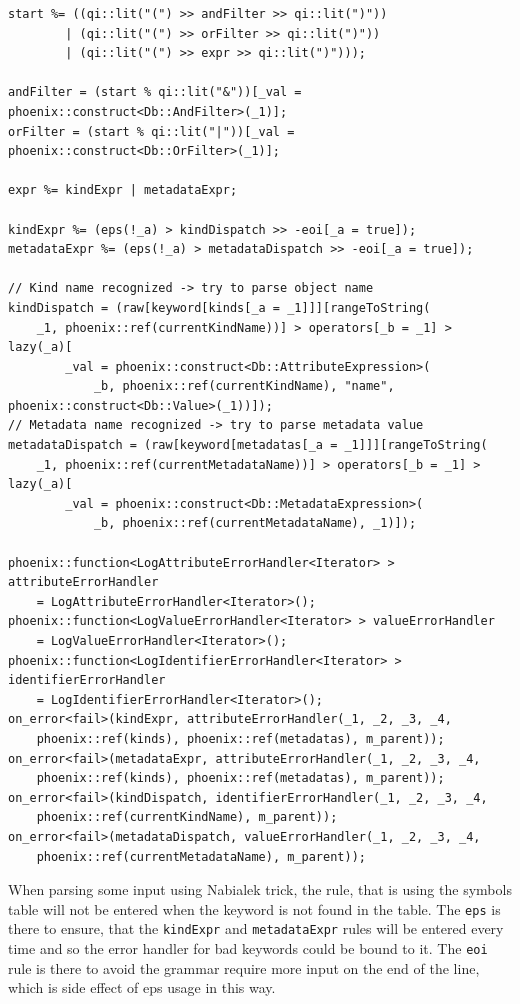 \documentclass[deska]{subfiles}
\begin{document}
\begin{verbatim}
start %= ((qi::lit("(") >> andFilter >> qi::lit(")"))
        | (qi::lit("(") >> orFilter >> qi::lit(")"))
        | (qi::lit("(") >> expr >> qi::lit(")")));

andFilter = (start % qi::lit("&"))[_val = phoenix::construct<Db::AndFilter>(_1)];
orFilter = (start % qi::lit("|"))[_val = phoenix::construct<Db::OrFilter>(_1)];

expr %= kindExpr | metadataExpr;

kindExpr %= (eps(!_a) > kindDispatch >> -eoi[_a = true]);
metadataExpr %= (eps(!_a) > metadataDispatch >> -eoi[_a = true]);

// Kind name recognized -> try to parse object name
kindDispatch = (raw[keyword[kinds[_a = _1]]][rangeToString(
    _1, phoenix::ref(currentKindName))] > operators[_b = _1] > lazy(_a)[
        _val = phoenix::construct<Db::AttributeExpression>(
            _b, phoenix::ref(currentKindName), "name", phoenix::construct<Db::Value>(_1))]);
// Metadata name recognized -> try to parse metadata value
metadataDispatch = (raw[keyword[metadatas[_a = _1]]][rangeToString(
    _1, phoenix::ref(currentMetadataName))] > operators[_b = _1] > lazy(_a)[
        _val = phoenix::construct<Db::MetadataExpression>(
            _b, phoenix::ref(currentMetadataName), _1)]);
        
phoenix::function<LogAttributeErrorHandler<Iterator> > attributeErrorHandler
    = LogAttributeErrorHandler<Iterator>();
phoenix::function<LogValueErrorHandler<Iterator> > valueErrorHandler
    = LogValueErrorHandler<Iterator>();
phoenix::function<LogIdentifierErrorHandler<Iterator> > identifierErrorHandler
    = LogIdentifierErrorHandler<Iterator>();
on_error<fail>(kindExpr, attributeErrorHandler(_1, _2, _3, _4,
    phoenix::ref(kinds), phoenix::ref(metadatas), m_parent));
on_error<fail>(metadataExpr, attributeErrorHandler(_1, _2, _3, _4,
    phoenix::ref(kinds), phoenix::ref(metadatas), m_parent));
on_error<fail>(kindDispatch, identifierErrorHandler(_1, _2, _3, _4,
    phoenix::ref(currentKindName), m_parent));
on_error<fail>(metadataDispatch, valueErrorHandler(_1, _2, _3, _4,
    phoenix::ref(currentMetadataName), m_parent));
\end{verbatim} 

When parsing some input using Nabialek trick, the rule, that is using the symbols table will not be entered when the keyword
is not found in the table. The {\tt eps} is there to ensure, that the {\tt kindExpr} and {\tt metadataExpr} rules will be
entered every time and so the error handler for bad keywords could be bound to it. The {\tt eoi} rule is there to avoid
the grammar require more input on the end of the line, which is side effect of eps usage in this way.
\end{document}
